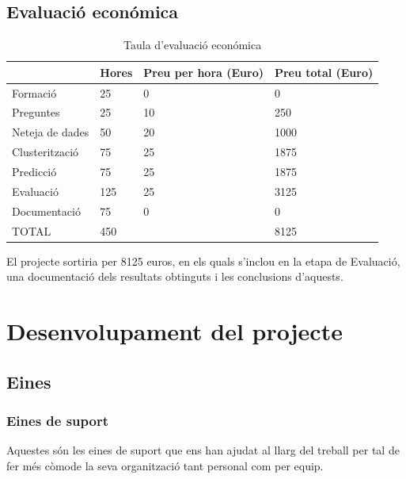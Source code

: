 \documentclass[12pt,a4paper,catalan]{article}
\begin{document}
\newpage

\subsection{Evaluació económica}



\begin{table}[h]
\centering

\begin{tabular}{@{}llll@{}}
\toprule
                & Hores & Preu per hora (Euro) & Preu total (Euro) \\ \midrule
Formació        & 25    & 0                 & 0              \\
Preguntes       & 25    & 10                & 250            \\
Neteja de dades & 50    & 20                & 1000           \\
Clusterització  & 75    & 25                & 1875           \\
Predicció       & 75    & 25                & 1875           \\
Evaluació       & 125   & 25                & 3125           \\
Documentació    & 75    & 0                 & 0              \\ \midrule
TOTAL           & 450   &                   & 8125           \\ \bottomrule
\end{tabular}
\caption{Taula d'evaluació económica}
\end{table}

El projecte sortiria per 8125 euros, en els quals s'inclou en la etapa de Evaluació, una documentació dels resultats obtinguts i les conclusions d'aquests.

\newpage

\section{Desenvolupament del projecte}
\subsection{Eines}
\subsubsection{Eines de suport}
Aquestes són les eines de suport que ens han ajudat al llarg del treball per tal de fer més còmode la seva organització tant personal com per equip.
\end{document}
